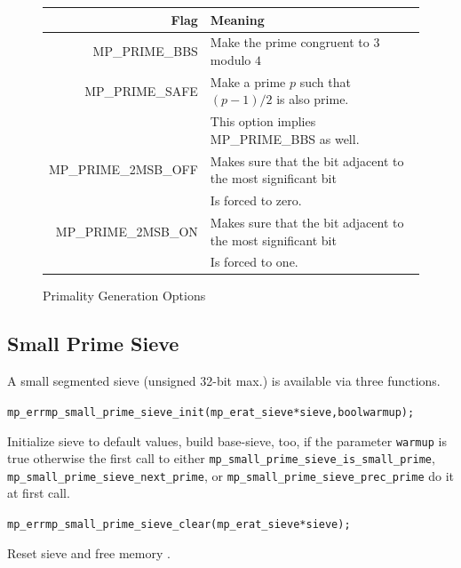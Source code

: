 \documentclass[synpaper]{book}
\begin{document}
\begin{figure}[h]
  \begin{center}
    \begin{small}
      \begin{tabular}{|r|l|}
        \hline \textbf{Flag}        & \textbf{Meaning}
        \\
        \hline MP\_PRIME\_BBS       & Make the prime congruent to $3$ modulo $4$
        \\
        \hline MP\_PRIME\_SAFE      & Make a prime $p$ such that $(p - 1)/2$ is also prime.
        \\
                                    & This option implies MP\_PRIME\_BBS as well.
        \\
        \hline MP\_PRIME\_2MSB\_OFF & Makes sure that the bit adjacent to the most significant bit
        \\
                                    & Is forced to zero.
        \\
        \hline MP\_PRIME\_2MSB\_ON  & Makes sure that the bit adjacent to the most significant bit
        \\
                                    & Is forced to one.
        \\
        \hline
      \end{tabular}
    \end{small}
  \end{center}
  \caption{Primality Generation Options}
  \label{fig:primeopts}
\end{figure}

\subsection{Small Prime Sieve}
A small segmented sieve (unsigned 32-bit max.) is available via three functions.


\begin{alltt}
mp_err mp_small_prime_sieve_init(mp_erat_sieve *sieve, bool warmup);
\end{alltt}
Initialize sieve to default values, build base-sieve, too, if the parameter {\texttt{warmup}} is true
otherwise the first call to either {\texttt{mp\_small\_prime\_sieve\_is\_small\_prime}},
{\texttt{mp\_small\_prime\_sieve\_next\_prime}}, or {\texttt{mp\_small\_prime\_sieve\_prec\_prime}}
do it at first call.

\begin{alltt}
mp_err mp_small_prime_sieve_clear(mp_erat_sieve *sieve);
\end{alltt}
Reset sieve and free memory .
\end{document}
